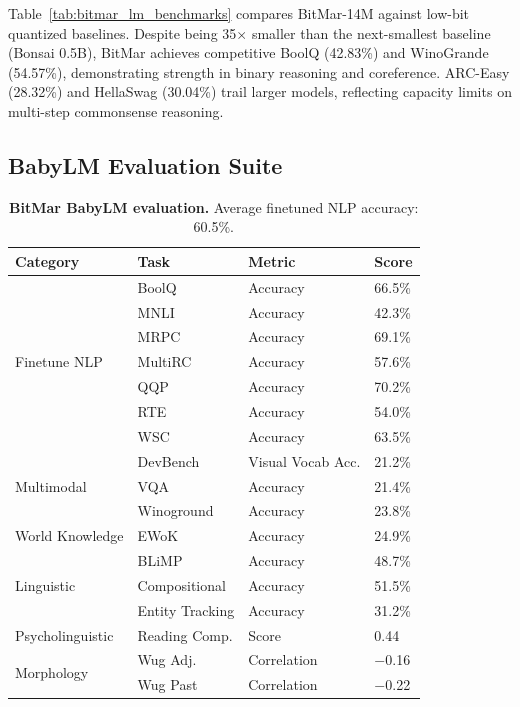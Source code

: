 Table~\ref{tab:bitmar_lm_benchmarks} compares BitMar-14M against low-bit quantized baselines. Despite being 35$\times$ smaller than the next-smallest baseline (Bonsai 0.5B), BitMar achieves competitive BoolQ (42.83\%) and WinoGrande (54.57\%), demonstrating strength in binary reasoning and coreference. ARC-Easy (28.32\%) and HellaSwag (30.04\%) trail larger models, reflecting capacity limits on multi-step commonsense reasoning.

\subsection{BabyLM Evaluation Suite}

\begin{table}[htbp]
\centering
\caption{\textbf{BitMar BabyLM evaluation.} Average finetuned NLP accuracy: 60.5\%.}
\label{tab:bitmar_babylm}
\begin{tabular}{llll}
\toprule
\textbf{Category} & \textbf{Task} & \textbf{Metric} & \textbf{Score} \\
\midrule
\multirow{7}{*}{Finetune NLP} & BoolQ & Accuracy & 66.5\% \\
 & MNLI & Accuracy & 42.3\% \\
 & MRPC & Accuracy & 69.1\% \\
 & MultiRC & Accuracy & 57.6\% \\
 & QQP & Accuracy & 70.2\% \\
 & RTE & Accuracy & 54.0\% \\
 & WSC & Accuracy & 63.5\% \\
\midrule
\multirow{3}{*}{Multimodal} & DevBench & Visual Vocab Acc. & 21.2\% \\
 & VQA & Accuracy & 21.4\% \\
 & Winoground & Accuracy & 23.8\% \\
\midrule
World Knowledge & EWoK & Accuracy & 24.9\% \\
\midrule
\multirow{3}{*}{Linguistic} & BLiMP & Accuracy & 48.7\% \\
 & Compositional & Accuracy & 51.5\% \\
 & Entity Tracking & Accuracy & 31.2\% \\
\midrule
Psycholinguistic & Reading Comp. & Score & 0.44 \\
\midrule
\multirow{2}{*}{Morphology} & Wug Adj. & Correlation & $-$0.16 \\
 & Wug Past & Correlation & $-$0.22 \\
\bottomrule
\end{tabular}
\end{table}

